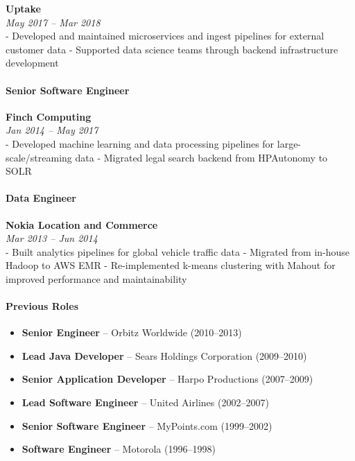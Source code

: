 \documentclass[11pt]{article}
\providecommand{\tightlist}{%
  \setlength{\itemsep}{0pt}\setlength{\parskip}{0pt}}
\begin{document}
\textbf{Uptake}\\
\emph{May 2017 -- Mar 2018}\\
- Developed and maintained microservices and ingest pipelines for
external customer data - Supported data science teams through backend
infrastructure development

\hypertarget{senior-software-engineer-1}{%
\paragraph{Senior Software Engineer}\label{senior-software-engineer-1}}

\textbf{Finch Computing}\\
\emph{Jan 2014 -- May 2017}\\
- Developed machine learning and data processing pipelines for
large-scale/streaming data - Migrated legal search backend from
HPAutonomy to SOLR

\hypertarget{data-engineer}{%
\paragraph{Data Engineer}\label{data-engineer}}

\textbf{Nokia Location and Commerce}\\
\emph{Mar 2013 -- Jun 2014}\\
- Built analytics pipelines for global vehicle traffic data - Migrated
from in-house Hadoop to AWS EMR - Re-implemented k-means clustering with
Mahout for improved performance and maintainability

\hypertarget{previous-roles}{%
\paragraph{Previous Roles}\label{previous-roles}}

\begin{itemize}
\tightlist
\item
  \textbf{Senior Engineer} -- Orbitz Worldwide (2010--2013)
\item
  \textbf{Lead Java Developer} -- Sears Holdings Corporation
  (2009--2010)
\item
  \textbf{Senior Application Developer} -- Harpo Productions
  (2007--2009)
\item
  \textbf{Lead Software Engineer} -- United Airlines (2002--2007)
\item
  \textbf{Senior Software Engineer} -- MyPoints.com (1999--2002)
\item
  \textbf{Software Engineer} -- Motorola (1996--1998)
\end{itemize}
\end{document}
